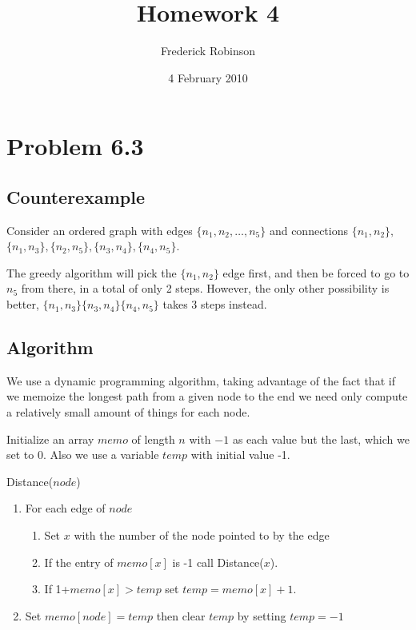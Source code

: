 \documentclass{article}
\title{Homework 4}
\author{Frederick Robinson}
\date{4 February 2010}
\begin{document}

   \maketitle



\section{Problem 6.3}

\subsection{Counterexample}
Consider an ordered graph with edges $\{n_1, n_2, \dots , n_5\}$ and connections $\{n_1,n_2\},$\\$\{n_1,n_3\},$$\{n_2,n_5\},\{n_3,n_4\},\{n_4,n_5\}$.

The greedy algorithm will pick the $\{n_1,n_2\}$ edge first, and then be forced to go to $n_5$ from there, in a total of only 2 steps. However, the only other possibility is better, $\{n_1,n_3\}\{n_3,n_4\}\{n_4,n_5\}$ takes 3 steps instead.

\subsection{Algorithm}
We use a dynamic programming algorithm, taking advantage of the fact that if we memoize the longest path from a given node to the end we need only compute a relatively small amount of things for each node.

Initialize an array $memo$ of length $n$ with $-1$ as each value but the last, which we set to 0. Also we use a variable $temp$ with initial value -1.

\begin{center}Distance($node$)\end{center}

\begin{enumerate}

\item \label{max} For each edge of  $node$
\begin{enumerate}
\item Set $x$ with the number of the node pointed to by the edge
\item If the entry of $memo[x]$ is -1 call Distance($x$).
\item If 1+$memo[x] > temp$ set $temp = memo[x]+1$.
\end{enumerate}
\item Set $memo[node] = temp$ then clear $temp$ by setting $temp=-1$

\end{enumerate}
\end{document}
